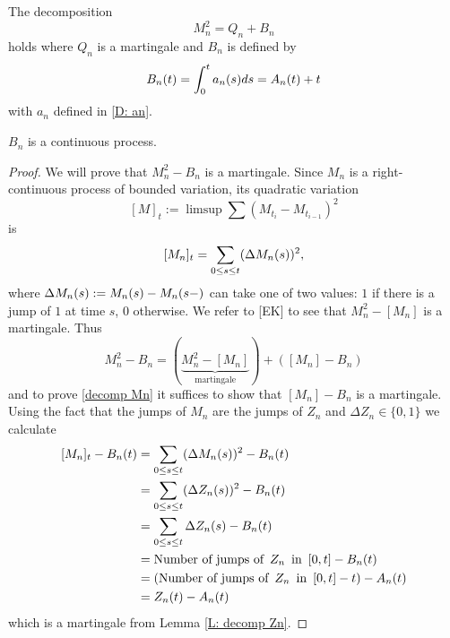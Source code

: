 \begin{lemma} \label{L: decomp Mn}
	The decomposition
	\begin{equation} \label{E: decomp Mn}
	M_n^2 = Q_n + B_n
	\end{equation}
	holds where $Q_n$ is a martingale and $B_n$ is defined by 
	\begin{equation} \label{D: An}
	B_n(t) = \int_{0}^{t} a_n(s)ds = A_n(t) + t
	\end{equation}
	with $a_n$ defined in \ref{D: an}.
\end{lemma}
\begin{note} \label{N: decomp Mn}
	$B_n$ is a continuous process.
\end{note}


\begin{proof} \label{P: decomp Mn}
	We will prove that
	$M_n^2 - B_n$
	is a martingale.
	Since $M_n$ is a right-continuous process of bounded variation, its quadratic variation
	\begin{equation*} \label{D: quadratic variation}
	[M]_t := \limsup \sum (M_{t_i} - M_{t_{i-1}})^2
	\end{equation*}
	is
	\begin{equation} \label{E: quadratic variation Mn}
	[M_n]_{t} = \sum_{0 \leq s \leq t} (\Delta M_n(s))^2,
	\end{equation}
	where
	$\Delta M_n(s) := M_n(s) - M_n(s-)$ 
	can take one of two values: $1$ if there is a jump of $1$ at time $s$, 0 otherwise.
	We refer to [EK] to see that
	$M_n^2 - [M_n]$
	is a martingale.
	Thus
	\begin{equation}
	M_n^2 - B_n = (\underbrace{M_n^2 - [M_n]}_{\text{martingale}}) + ([M_n] - B_n)
	\end{equation}
	and to prove \ref{decomp Mn} it suffices to show that
	$[M_n] - B_n$
	is a martingale.
	Using the fact that the jumps of $M_n$ are the jumps of $Z_n$ and
	$\Delta Z_n \in \lbrace0,1 \rbrace$
	we calculate
	\begin{align*}
	[M_n]_{t} - B_n(t)
	&= \sum_{0 \leq s \leq t} (\Delta M_n(s))^2 - B_n(t) \\
	&= \sum_{0 \leq s \leq t} (\Delta Z_n(s))^2 - B_n(t) \\
	&= \sum_{0 \leq s \leq t} \Delta Z_n(s) - B_n(t) \\
	&= \text{Number of jumps of} \enspace Z_n \enspace \text{in} \enspace [0,t] - B_n(t) \\
	&= (\text{Number of jumps of} \enspace Z_n \enspace \text{in} \enspace [0,t] - t) - A_n(t) \\
	&= Z_n(t) - A_n(t)
	\end{align*}
	which is a martingale from Lemma \ref{L: decomp Zn}.
	
\end{proof}


